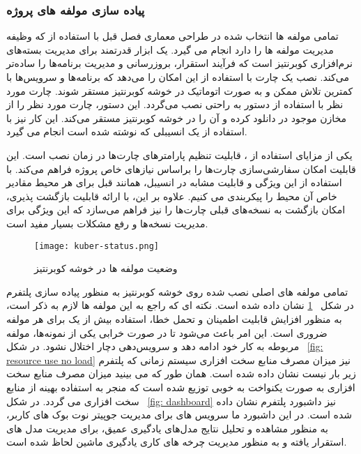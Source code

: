 \subsubsection{پیاده سازی مولفه های پروژه}
تمامی مولفه ها انتخاب شده در طراحی معماری فصل قبل با استفاده از  که وظیفه مدیریت مولفه ها را دارد انجام می گیرد.  یک ابزار قدرتمند برای مدیریت بسته‌های نرم‌افزاری کوبرنتیز است که فرآیند استقرار، بروزرسانی و مدیریت برنامه‌ها را ساده‌تر می‌کند. نصب یک چارت با استفاده از  این امکان را می‌دهد که برنامه‌ها و سرویس‌ها با کمترین تلاش ممکن و به صورت اتوماتیک در خوشه کوبرنتیز مستقر شوند. چارت مورد نظر با استفاده از دستور  به راحتی نصب می‌گردد. این دستور، چارت مورد نظر را از مخازن موجود در  دانلود کرده و آن را در خوشه کوبرنتیز مستقر می‌کند. این کار نیز با استفاده از یک  انسیبلی که نوشته شده است انجام می گیرد. 

یکی از مزایای استفاده از ، قابلیت تنظیم پارامترهای چارت‌ها در زمان نصب است. این قابلیت امکان سفارشی‌سازی چارت‌ها را براساس نیازهای خاص پروژه فراهم می‌کند. با استفاده از این ویژگی و قابلیت مشابه در انسیبل، همانند قبل برای هر محیط مقادیر خاص آن محیط را پیکربندی می کنیم. علاوه بر این،  با ارائه قابلیت بازگشت پذیری، امکان بازگشت به نسخه‌های قبلی چارت‌ها را نیز فراهم می‌سازد که این ویژگی برای مدیریت نسخه‌ها و رفع مشکلات بسیار مفید است. 
\begin{figure}[!t]
	\centering
	\texttt{[image: kuber-status.png]}
	\caption{وضعیت مولفه ها در خوشه کوبرنتیز}
	\label{fig: kuber status}
\end{figure}
تمامی مولفه های اصلی نصب شده روی خوشه کوبرنتیز به منظور پیاده سازی پلتفرم  در شکل
~\ref{fig: kuber status}
 نشان داده شده است. نکته ای که راجع به این مولفه ها لازم به ذکر است، به منظور افزایش قابلیت اطمینان و تحمل خطا، استفاده بیش از یک  برای هر مولفه ضروری است. این امر باعث می‌شود تا در صورت خرابی یکی از نمونه‌ها، مولفه مربوطه به کار خود ادامه دهد و سرویس‌دهی دچار اختلال نشود.
در شکل 
~\ref{fig: resource use no load}
نیز میزان مصرف منابع سخت افزاری سیستم زمانی که پلتفرم زیر بار نیست نشان داده شده است. همان طور که می بینید میزان مصرف منابع سخت افزاری به صورت یکنواخت به خوبی توزیع شده است که منجر به استفاده بهینه از منابع سخت افزاری می گردد. در شکل 
~\ref{fig: dashboard}
نیز داشبورد پلتفرم نشان داده شده است. در این داشبورد ما سرویس های  برای مدیریت جوپیتر نوت بوک های کاربر،  به منظور مشاهده و تحلیل نتایج مدل‌های یادگیری عمیق،‌  برای مدیریت مدل های استقرار یافته و‌  به منظور مدیریت چرخه های کاری یادگیری ماشین لحاظ شده است.

